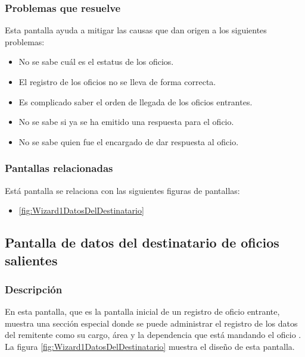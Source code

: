 \subsubsection{Problemas que resuelve}
Esta pantalla ayuda a mitigar las causas que dan origen a los siguientes problemas:

	\begin{itemize}
		\item No se sabe cuál es el estatus de los oficios.
		\item El registro de los oficios no se lleva de forma correcta.
		\item Es complicado saber el orden de llegada de los oficios entrantes.
		\item No se sabe si ya se ha emitido una respuesta para el oficio.
		\item No se sabe quien fue el encargado de dar respuesta al oficio.
	\end{itemize}

\subsubsection{Pantallas relacionadas}
Está pantalla se relaciona con las siguientes figuras de pantallas:
	\begin{itemize}
		\item \ref{fig:Wizard1DatosDelDestinatario}
	\end{itemize}
	
\subsection{Pantalla de datos del destinatario de oficios salientes}
\subsubsection{Descripción}
En esta pantalla, que es la pantalla inicial de un registro de oficio entrante, muestra una sección especial donde se puede administrar el registro de los datos del remitente como su cargo, área y la dependencia que está mandando el oficio . La figura \ref{fig:Wizard1DatosDelDestinatario} muestra el diseño de esta pantalla.	
		
